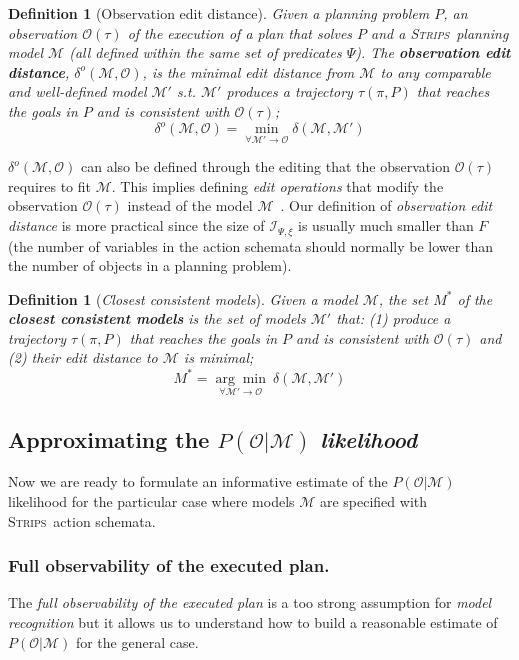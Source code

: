 \documentclass[letterpaper]{article} %
\newcommand{\strips}{\textsc{Strips}}     %
\newtheorem{definition}[theorem]{Definition}
\begin{document}
\begin{definition}[Observation edit distance]
Given a planning problem $P$, an observation $\mathcal{O}(\tau)$ of the execution of a plan that solves $P$ and a \strips\ planning model $\mathcal{M}$ (all defined within the same set of predicates $\Psi$). The {\bf observation edit distance}, $\delta^o(\mathcal{M},\mathcal{O})$, is the minimal edit distance from $\mathcal{M}$ to any {\em comparable} and well-defined model $\mathcal{M}'$ s.t. $\mathcal{M}'$ produces a trajectory $\tau(\pi,P)$ that reaches the goals in $P$ and is {\em consistent} with $\mathcal{O}(\tau)$; \[\delta^o(\mathcal{M},\mathcal{O})=\min_{\forall \mathcal{M}' \rightarrow \mathcal{O}} \delta(\mathcal{M},\mathcal{M}')\]
\end{definition}

$\delta^o(\mathcal{M},\mathcal{O})$ can also be defined through the editing that the observation $\mathcal{O}(\tau)$ requires to fit $\mathcal{M}$. This implies defining {\em edit operations} that modify the observation $\mathcal{O}(\tau)$ instead of the model $\mathcal{M}$~\cite{yang2007learning,SohrabiRU16}. Our definition of {\em observation edit distance} is more practical since the size of ${\mathcal I}_{\Psi,\xi}$ is usually much smaller than $F$ (the number of variables in the action schemata should normally be lower than the number of objects in a planning problem).

\begin{definition}[{\em Closest consistent models}] \label{consistent}
Given a model $\mathcal{M}$, the set $M^*$ of the {\bf closest consistent models} is the set of models $\mathcal{M}'$ that: (1) produce a trajectory $\tau(\pi,P)$ that reaches the goals in $P$ and is {\em consistent} with $\mathcal{O}(\tau)$ and (2) their {\em edit distance} to $\mathcal{M}$ is minimal;
  \[M^*=\underset{\forall \mathcal{M}' \rightarrow \mathcal{O}}{\arg\min}\ \delta(\mathcal{M},\mathcal{M}') \]
\end{definition}

\subsection{Approximating the $P(\mathcal{O}|\mathcal{M})$ {\em likelihood}}

Now we are ready to formulate an informative estimate of the $P(\mathcal{O}|\mathcal{M})$ likelihood for the particular case where models $\mathcal{M}$ are specified with \strips\ action schemata.

\subsubsection{Full observability of the executed plan.} The {\em full observability of the executed plan} is a too strong assumption for {\em model recognition} but it allows us to understand how to build a reasonable estimate of $P(\mathcal{O}|\mathcal{M})$ for the general case.
\end{document}
